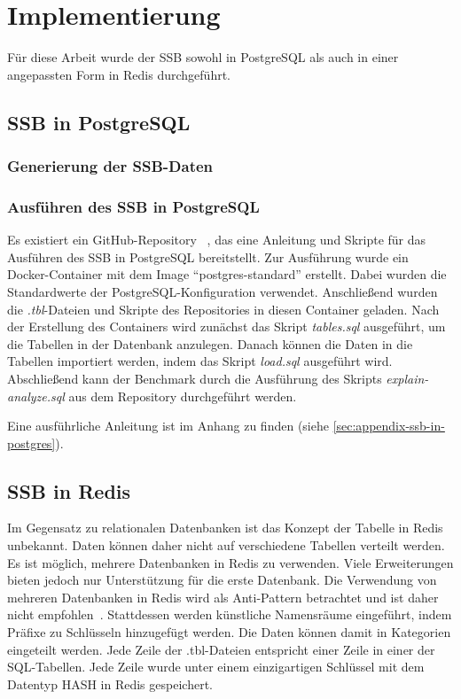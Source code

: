 \chapter{Implementierung}
Für diese Arbeit wurde der \acl{SSB} sowohl in PostgreSQL als auch in einer angepassten Form in Redis durchgeführt.
\section{\acl{SSB} in PostgreSQL}
\subsection{Generierung der \acs{SSB}-Daten}

\subsection{Ausführen des \acl{SSB} in PostgreSQL}

Es existiert ein GitHub-Repository ~\cite{nukoyokohama_ssb-postgres_2023}, das eine Anleitung und Skripte für das Ausführen des \ac{SSB} in PostgreSQL bereitstellt.
Zur Ausführung wurde ein Docker-Container mit dem Image \enquote{postgres-standard} erstellt.
Dabei wurden die Standardwerte der PostgreSQL-Konfiguration verwendet.
Anschließend wurden die \emph{.tbl}-Dateien und Skripte des Repositories in diesen Container geladen. 
Nach der Erstellung des Containers wird zunächst das Skript \emph{tables.sql} ausgeführt, um die Tabellen in der Datenbank anzulegen.
Danach können die Daten in die Tabellen importiert werden, indem das Skript \emph{load.sql} ausgeführt wird.
Abschließend kann der Benchmark durch die Ausführung des Skripts \emph{explain-analyze.sql} aus dem Repository durchgeführt werden.

Eine ausführliche Anleitung ist im Anhang zu finden (siehe \cref{sec:appendix-ssb-in-postgres}).

\section{\acs{SSB} in Redis}
Im Gegensatz zu relationalen Datenbanken ist das Konzept der Tabelle in Redis unbekannt.
Daten können daher nicht auf verschiedene Tabellen verteilt werden.
Es ist möglich, mehrere Datenbanken in Redis zu verwenden. Viele Erweiterungen bieten jedoch nur Unterstützung für die erste Datenbank.
Die Verwendung von mehreren Datenbanken in Redis wird als Anti-Pattern betrachtet und ist daher nicht empfohlen~\cite{prickett_answer_2022}.
Stattdessen werden künstliche Namensräume eingeführt, indem Präfixe zu Schlüsseln hinzugefügt werden.
Die Daten können damit in Kategorien eingeteilt werden.
Jede Zeile der .tbl-Dateien entspricht einer Zeile in einer der SQL-Tabellen.
Jede Zeile wurde unter einem einzigartigen Schlüssel mit dem Datentyp HASH in Redis gespeichert.

